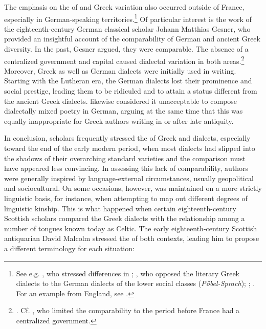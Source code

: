 The emphasis on the  of  and Greek variation also occurred outside of France, especially in German-speaking territories.\footnote{See e.g. \citet[b.2\textsc{\textsuperscript{v}}\textsc{–}b.3\textsc{\textsuperscript{r}}]{Nibbe1725}, who stressed differences in ; \citet[1131--1132]{[frisch]1730}, who opposed the literary Greek dialects to the German dialects of the lower social classes (\textit{Pöbel-Sprach}); \citet[6--8]{[frederick1780}; \citet[203--204]{Ries1786}. For an example from England, see \citet[13--14]{Bayly1756}.} Of particular interest is the work of the eighteenth-century German classical scholar Johann Matthias Gesner, who provided an insightful account of the comparability of German and ancient Greek diversity. In the past, Gesner argued, they were comparable. The absence of a centralized government and capital caused dialectal variation in both areas.\footnote{\citet[160--161]{Gesner1774}. Cf. \citet[lxviii]{Court1778}, who limited the comparability to the period before France had a centralized government.} Moreover, Greek as well as German dialects were initially used in writing. Starting with the Lutheran era, the German dialects lost their prominence and social prestige, leading them to be ridiculed and to attain a status different from the ancient Greek dialects. \citet[162]{Gesner1774} likewise considered it unacceptable to compose dialectally mixed poetry in German, arguing at the same time that this was equally inappropriate for Greek authors writing in or after late antiquity.

In conclusion, scholars frequently stressed the  of Greek and  dialects, especially toward the end of the early modern period, when most  dialects had slipped into the shadows of their overarching standard varieties and the comparison must have appeared less convincing. In assessing this lack of comparability, authors were generally inspired by language-external circumstances, usually geopolitical and sociocultural. On some occasions, however,  was maintained on a more strictly linguistic basis, for instance, when attempting to map out different degrees of linguistic kinship. This is what happened when certain eighteenth-century Scottish scholars compared the Greek dialects with the relationship among a number of tongues known today as Celtic. The early eighteenth-century Scottish antiquarian David Malcolm stressed the  of both contexts, leading him to propose a different terminology for each situation:

